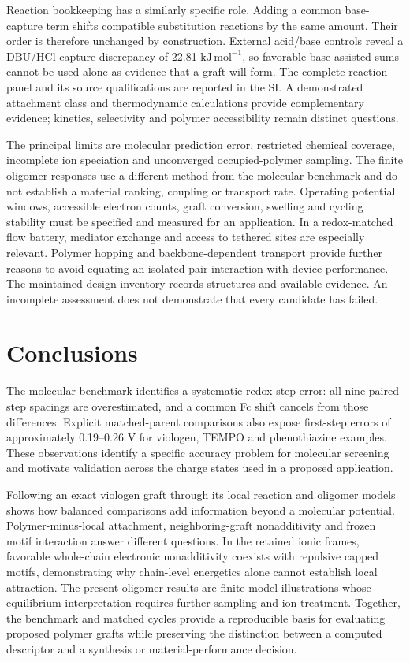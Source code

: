 \documentclass[11pt]{article}
\newcommand{\kj}{\ensuremath{\mathrm{kJ\,mol^{-1}}}}
\begin{document}
Reaction bookkeeping has a similarly specific role. Adding a common base-capture term shifts compatible substitution reactions by the same amount. Their order is therefore unchanged by construction. External acid/base controls reveal a DBU/HCl capture discrepancy of 22.81 \kj, so favorable base-assisted sums cannot be used alone as evidence that a graft will form. The complete reaction panel and its source qualifications are reported in the SI. A demonstrated attachment class and thermodynamic calculations provide complementary evidence; kinetics, selectivity and polymer accessibility remain distinct questions.

The principal limits are molecular prediction error, restricted chemical coverage, incomplete ion speciation and unconverged occupied-polymer sampling. The finite oligomer responses use a different method from the molecular benchmark and do not establish a material ranking, coupling or transport rate. Operating potential windows, accessible electron counts, graft conversion, swelling and cycling stability must be specified and measured for an application. In a redox-matched flow battery, mediator exchange and access to tethered sites are especially relevant.\cite{kim2022} Polymer hopping and backbone-dependent transport provide further reasons to avoid equating an isolated pair interaction with device performance.\cite{hopping2013,oyaizu2008,mohanty2026backbone} The maintained design inventory records structures and available evidence. An incomplete assessment does not demonstrate that every candidate has failed.

\section{Conclusions}
The molecular benchmark identifies a systematic redox-step error: all nine paired step spacings are overestimated, and a common Fc shift cancels from those differences. Explicit matched-parent comparisons also expose first-step errors of approximately 0.19--0.26 V for viologen, TEMPO and phenothiazine examples. These observations identify a specific accuracy problem for molecular screening and motivate validation across the charge states used in a proposed application.

Following an exact viologen graft through its local reaction and oligomer models shows how balanced comparisons add information beyond a molecular potential. Polymer-minus-local attachment, neighboring-graft nonadditivity and frozen motif interaction answer different questions. In the retained ionic frames, favorable whole-chain electronic nonadditivity coexists with repulsive capped motifs, demonstrating why chain-level energetics alone cannot establish local attraction. The present oligomer results are finite-model illustrations whose equilibrium interpretation requires further sampling and ion treatment. Together, the benchmark and matched cycles provide a reproducible basis for evaluating proposed polymer grafts while preserving the distinction between a computed descriptor and a synthesis or material-performance decision.
\end{document}
